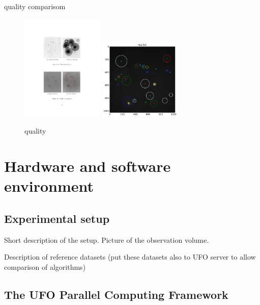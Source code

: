 quality comparisom
\begin{figure}
\centering
\includegraphics[width=0.35\textwidth]{figs/alex-result.pdf}\qquad
\includegraphics[width=0.35\textwidth]{figs/chuan-res.png}
\label{fig:input}
\caption{quality}
\end{figure}

\section{Hardware and software environment}



\subsection{Experimental setup}



Short description of the setup. Picture of the observation volume. 



Description of reference datasets (put these datasets also to UFO server to allow comparison of algorithms)





\subsection{The UFO Parallel Computing Framework}



